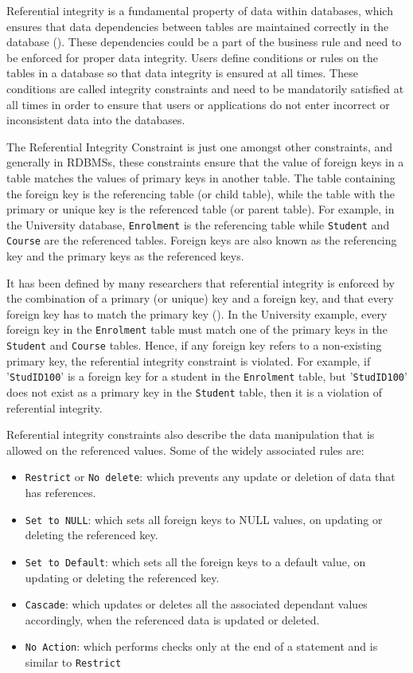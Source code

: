 Referential integrity is a fundamental property of data within databases,   which
ensures that data dependencies between tables are maintained correctly in the
database ().  These dependencies could be a part of the
business rule and need to be enforced for proper data integrity.  Users define
conditions or rules on the tables in a database so that data integrity is
ensured at all times.  These conditions are called integrity constraints and need
to be mandatorily satisfied at all times in order to ensure that users or
applications do not enter incorrect or inconsistent data into the databases. 

The Referential Integrity Constraint is just one amongst other constraints,   and
generally in \acp{RDBMS},   these constraints ensure that the value of foreign
keys in a table matches the values of primary keys in another table.  The table
containing the foreign key is the referencing table (or child table),  
while the table with the primary or unique key is the referenced table (or parent table). 
For example,   in the University database,   \texttt{Enrolment} is the
referencing table while \texttt{Student} and \texttt{Course} are the
referenced tables.  Foreign keys are also known as the referencing key and
the primary keys as the referenced keys. 

It has been defined by many researchers that referential integrity is enforced
by the combination of a primary (or unique) key and a foreign key,   and that
every foreign key has to match the primary key ().  In the
University example,   every foreign key in the \texttt{Enrolment} table must match
one of the primary keys in the \texttt{Student} and \texttt{Course} tables. 
Hence,   if any foreign key refers to a non-existing primary key,   the
referential integrity constraint is violated.   For example,   if
'\texttt{StudID100}' is a foreign key for a student in the \texttt{Enrolment}
table,   but '\texttt{StudID100}' does not exist as a primary key in the \texttt{Student}
table,   then it is a violation of referential integrity. 
 
Referential integrity constraints also describe the data manipulation that is
allowed on the referenced values.  Some of the widely associated rules are:

\begin{itemize}
  \item \texttt{Restrict} or \texttt{No delete}: which prevents any update or
  deletion of data that has references. 
\item \texttt{Set to NULL}: which sets all foreign keys to NULL values,   on
updating or deleting the referenced key. 
\item \texttt{Set to Default}: which sets all the foreign
keys to a default value,   on updating or deleting the referenced key. 
\item \texttt{Cascade}: which updates or deletes all the
associated dependant values accordingly,   when the referenced data is updated or
deleted. 
\item \texttt{No Action}: which performs checks only at the end of a
statement and is similar to \texttt{Restrict}
\end{itemize}

